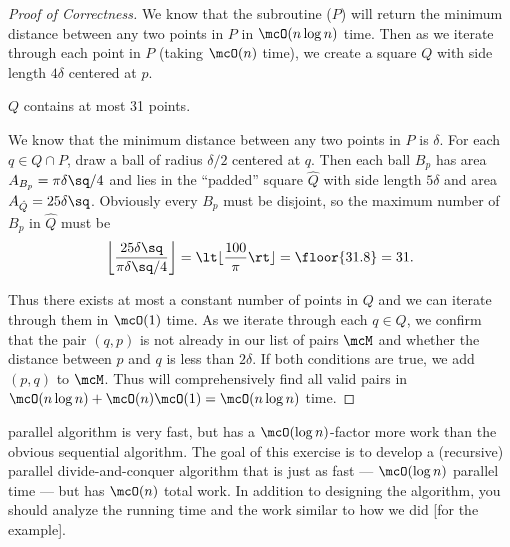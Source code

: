 \documentclass[10pt]{article}
\begin{document}
\begin{proof}[Proof of Correctness]
We know that the subroutine (\( P \)) will return the minimum distance between any two points in \( P \) in \( \mcO(n\log n) \) time. Then as we iterate through each point in \( P \) (taking \( \mcO(n) \) time), we create a square \( Q \) with side length \( 4\delta \) centered at \( p \).
  \begin{claim}
    \( Q \) contains at most 31 points.
  \end{claim}
  \begin{subproof}
  We know that the minimum distance between any two points in \( P \) is \( \delta \). For each \( q\in Q\cap P \), draw a ball of radius \( \delta/2 \) centered at \( q \). Then each ball \( B_p \) has area \( A_{B_p} = \pi \delta\sq /4 \) and lies in the ``padded'' square \( \hat Q \) with side length \( 5\delta \) and area \( A_{\hat Q} = 25\delta\sq \). Obviously every \( B_p \) must be disjoint, so the maximum number of \( B_p \) in \( \hat Q \) must be \begin{align*}
    \left\lfloor\frac{25\delta\sq}{\pi\delta\sq/4}\right\rfloor = \lt\lfloor\frac{100}{\pi}\rt\rfloor = \floor{31.8} = 31.
  \end{align*}
\end{subproof}
Thus there exists at most a constant number of points in \( Q \) and we can iterate through them in \( \mcO(1) \) time. As we iterate through each \( q\in Q \), we confirm that the pair \( (q,p) \) is not already in our list of pairs \( \mcM \) and whether the distance between \( p \) and \( q \) is less than \( 2\delta \). If both conditions are true, we add \( (p,q) \) to \( \mcM \). Thus  will comprehensively find all valid pairs in \( \mcO(n\log n) + \mcO(n)\mcO(1) = \mcO(n\log n) \) time.
\end{proof}
\pagebreak

\setcounter{exercise}{5}
\begin{exercise} %
   parallel algorithm is very fast, but has a \( \mcO(\log n) \)-factor more work than the obvious sequential algorithm.
  The goal of this exercise is to develop a (recursive) parallel divide-and-conquer algorithm that is just as fast --- \( \mcO(\log n) \) parallel time --- but has \( \mcO(n) \) total work.
  In addition to designing the algorithm, you should analyze the running time and the work similar to how we did [for the example].
\end{exercise}
\end{document}
